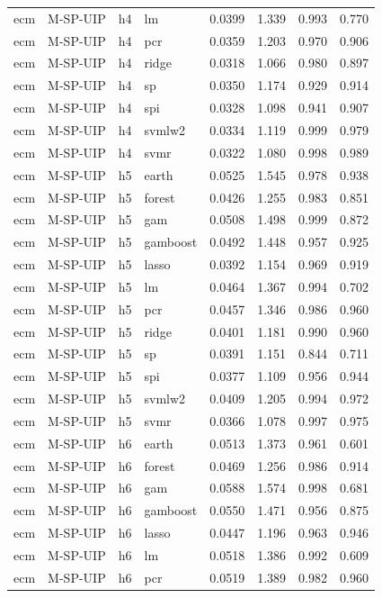\begin{ThreePartTable}
\begin{longtable}[t]{llclcccc}
ecm & M-SP-UIP & h4 & lm & 0.0399 & 1.339 & 0.993 & 0.770\\
ecm & M-SP-UIP & h4 & pcr & 0.0359 & 1.203 & 0.970 & 0.906\\
ecm & M-SP-UIP & h4 & ridge & 0.0318 & 1.066 & 0.980 & 0.897\\
ecm & M-SP-UIP & h4 & sp & 0.0350 & 1.174 & 0.929 & 0.914\\
ecm & M-SP-UIP & h4 & spi & 0.0328 & 1.098 & 0.941 & 0.907\\
ecm & M-SP-UIP & h4 & svmlw2 & 0.0334 & 1.119 & 0.999 & 0.979\\
ecm & M-SP-UIP & h4 & svmr & 0.0322 & 1.080 & 0.998 & 0.989\\
\addlinespace
ecm & M-SP-UIP & h5 & earth & 0.0525 & 1.545 & 0.978 & 0.938\\
ecm & M-SP-UIP & h5 & forest & 0.0426 & 1.255 & 0.983 & 0.851\\
ecm & M-SP-UIP & h5 & gam & 0.0508 & 1.498 & 0.999 & 0.872\\
ecm & M-SP-UIP & h5 & gamboost & 0.0492 & 1.448 & 0.957 & 0.925\\
ecm & M-SP-UIP & h5 & lasso & 0.0392 & 1.154 & 0.969 & 0.919\\
ecm & M-SP-UIP & h5 & lm & 0.0464 & 1.367 & 0.994 & 0.702\\
ecm & M-SP-UIP & h5 & pcr & 0.0457 & 1.346 & 0.986 & 0.960\\
ecm & M-SP-UIP & h5 & ridge & 0.0401 & 1.181 & 0.990 & 0.960\\
ecm & M-SP-UIP & h5 & sp & 0.0391 & 1.151 & 0.844 & 0.711\\
ecm & M-SP-UIP & h5 & spi & 0.0377 & 1.109 & 0.956 & 0.944\\
ecm & M-SP-UIP & h5 & svmlw2 & 0.0409 & 1.205 & 0.994 & 0.972\\
ecm & M-SP-UIP & h5 & svmr & 0.0366 & 1.078 & 0.997 & 0.975\\
\addlinespace
ecm & M-SP-UIP & h6 & earth & 0.0513 & 1.373 & 0.961 & 0.601\\
ecm & M-SP-UIP & h6 & forest & 0.0469 & 1.256 & 0.986 & 0.914\\
ecm & M-SP-UIP & h6 & gam & 0.0588 & 1.574 & 0.998 & 0.681\\
ecm & M-SP-UIP & h6 & gamboost & 0.0550 & 1.471 & 0.956 & 0.875\\
ecm & M-SP-UIP & h6 & lasso & 0.0447 & 1.196 & 0.963 & 0.946\\
ecm & M-SP-UIP & h6 & lm & 0.0518 & 1.386 & 0.992 & 0.609\\
ecm & M-SP-UIP & h6 & pcr & 0.0519 & 1.389 & 0.982 & 0.960\\

\end{longtable}
\end{ThreePartTable}

